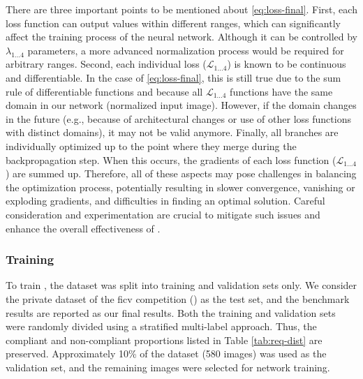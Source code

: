 There are three important points to be mentioned about \autoref{eq:loss-final}. First, each loss function can output values within different ranges, which can significantly affect the training process of the neural network. Although it can be controlled by $\lambda_{1...4}$ parameters, a more advanced normalization process would be required for arbitrary ranges. Second, each individual loss ($\mathcal{L}_{1...4}$) is known to be continuous and differentiable. In the case of \autoref{eq:loss-final}, this is still true due to the sum rule of differentiable functions \citep[p.~250]{strang2020calculus} and because all $\mathcal{L}_{1...4}$ functions have the same domain in our network (normalized input image). However, if the domain changes in the future (e.g., because of architectural changes or use of other loss functions with distinct domains), it may not be valid anymore. Finally, all branches are individually optimized up to the point where they merge during the backpropagation step. When this occurs, the gradients of each loss function ($\mathcal{L}_{1...4}$) are summed up. Therefore, all of these aspects may pose challenges in balancing the optimization process, potentially resulting in slower convergence, vanishing or exploding gradients, and difficulties in finding an optimal solution. Careful consideration and experimentation are crucial to mitigate such issues and enhance the overall effectiveness of \methodname.
 
\subsubsection{Training} 
 
To train \methodname, the \adhoc dataset was split into training and validation sets only. We consider the private dataset of the \acs{ficv} competition (\ficvofficial) as the test set, and the benchmark results are reported as our final results. Both the training and validation sets were randomly divided using a stratified multi-label approach. Thus, the compliant and non-compliant proportions listed in Table \ref{tab:req-dist} are preserved. Approximately 10\% of the dataset (580 images) was used as the validation set, and the remaining images were selected for network training.
 
